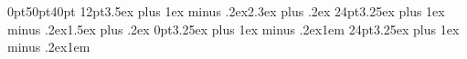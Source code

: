    \titleformat{\subsection}{\normalfont\large\bfseries}{\thesubsection}{1em}{}
   \titleformat{\subsubsection}{\normalfont\normalsize\bfseries}{\thesubsubsection)}{1em}{}
   \titleformat{\paragraph}[runin]{\normalfont\normalsize\bfseries}{\theparagraph}{1em}{}
   \titleformat{\subparagraph}[runin]{\normalfont\normalsize\bfseries}{\thesubparagraph}{1em}{}
   \titlespacing*{\chapter} {0pt}{50pt}{40pt}
   \titlespacing*{\section} {12pt}{3.5ex plus 1ex minus .2ex}{2.3ex plus .2ex}
   \titlespacing*{\subsection} {24pt}{3.25ex plus 1ex minus .2ex}{1.5ex plus .2ex}
   \titlespacing*{\paragraph} {0pt}{3.25ex plus 1ex minus .2ex}{1em}
   \titlespacing*{\subparagraph} {24pt}{3.25ex plus 1ex minus .2ex}{1em}
   

